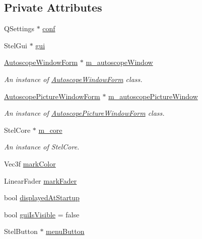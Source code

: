 \subsection*{Private Attributes}
\begin{DoxyCompactItemize}
\item 
Q\+Settings $\ast$ \mbox{\hyperlink{class_autoscope_a6a17eb00225f765623844eaa9f80e71e}{conf}}
\item 
Stel\+Gui $\ast$ \mbox{\hyperlink{class_autoscope_a90c44f576ab3acd74da3af3ad8162ca7}{gui}}
\item 
\mbox{\hyperlink{class_autoscope_window_form}{Autoscope\+Window\+Form}} $\ast$ \mbox{\hyperlink{class_autoscope_a33104164061c784c65c1f94bfde26423}{m\+\_\+autoscope\+Window}}
\begin{DoxyCompactList}\small\item\em An instance of \mbox{\hyperlink{class_autoscope_window_form}{Autoscope\+Window\+Form}} class. \end{DoxyCompactList}\item 
\mbox{\hyperlink{class_autoscope_picture_window_form}{Autoscope\+Picture\+Window\+Form}} $\ast$ \mbox{\hyperlink{class_autoscope_a75a50ab46f25c007b9a86d3776385fc6}{m\+\_\+autoscope\+Picture\+Window}}
\begin{DoxyCompactList}\small\item\em An instance of \mbox{\hyperlink{class_autoscope_picture_window_form}{Autoscope\+Picture\+Window\+Form}} class. \end{DoxyCompactList}\item 
Stel\+Core $\ast$ \mbox{\hyperlink{class_autoscope_aa333cfe8f256f5698c686423cad648c2}{m\+\_\+core}}
\begin{DoxyCompactList}\small\item\em An instance of Stel\+Core. \end{DoxyCompactList}\item 
Vec3f \mbox{\hyperlink{class_autoscope_a58327daadc555f31fc62b6db85e3fcfa}{mark\+Color}}
\item 
Linear\+Fader \mbox{\hyperlink{class_autoscope_a9c141894e06ed64f4131f1071e9e18af}{mark\+Fader}}
\item 
bool \mbox{\hyperlink{class_autoscope_a8c066a069946815c05fe7d32b13211d3}{displayed\+At\+Startup}}
\item 
bool \mbox{\hyperlink{class_autoscope_ac995550136b93293df166aead2eda5b7}{gui\+Is\+Visible}} = false
\item 
Stel\+Button $\ast$ \mbox{\hyperlink{class_autoscope_a5b14962697fbd8fffac986df08aee611}{menu\+Button}}

\end{DoxyCompactItemize}
